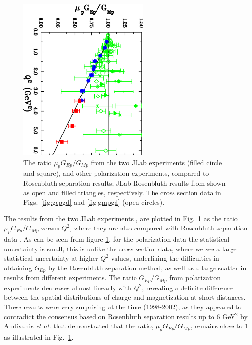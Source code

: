 \begin{figure}
\begin{center}
\includegraphics[width=65mm,angle=90]{gepgmp_world_027_bw_p.eps}
\caption{The ratio $\mu_p G_{Ep}/G_{Mp}$ from the two JLab experiments \cite{gayou:2002,punjabi05A} (filled circle and square),
and other polarization experiments, compared to Rosenbluth separation results; JLab Rosenbluth 
results from \cite{christy,qattan05} shown as open and filled triangles, respectively. The cross section data  
in Figs.~\ref{fig:gepgd} and \ref{fig:gmpgd} (open circles).} 
\label{fig:gepgmp_pol_cs}
\end{center}
\end{figure} 

The results from the two JLab experiments \cite{jones,punjabi05A,gayou:2002}, are plotted 
in Fig.~\ref{fig:gepgmp_pol_cs} as the ratio $\mu_{p}G_{Ep}/G_{Mp}$ versus $Q^2$, where they are also
compared with Rosenbluth separation data \cite{andivahisA,christy,qattan05,wilsonrr,berger,bartel,price,hanson,litt}.
As can be seen from figure \ref{fig:gepgmp_pol_cs}, for the polarization data the statistical
uncertainty is small; this is unlike the cross section data, 
where we see a large statistical uncertainty at higher $Q^2$ values, underlining
the difficulties in obtaining $G_{Ep}$ by the Rosenbluth separation method, as well as a large scatter 
in results from different experiments. 
The ratio $G_{Ep}/G_{Mp}$ from polarization experiments decreases almost linearly
with $Q^2$, revealing a definite difference between the spatial distributions of charge and magnetization at 
short distances. These results were very surprising at the time (1998-2002), as they appeared to contradict 
the consensus based on Rosenbluth separation results up to 6 GeV$^2$ by Andivahis {\it et al.} \cite{andivahisA} that demonstrated 
that the ratio, $\mu_{p}G_{Ep}/G_{Mp}$, remains close to 1 as illustrated in Fig.~\ref{fig:gepgmp_pol_cs}. 

